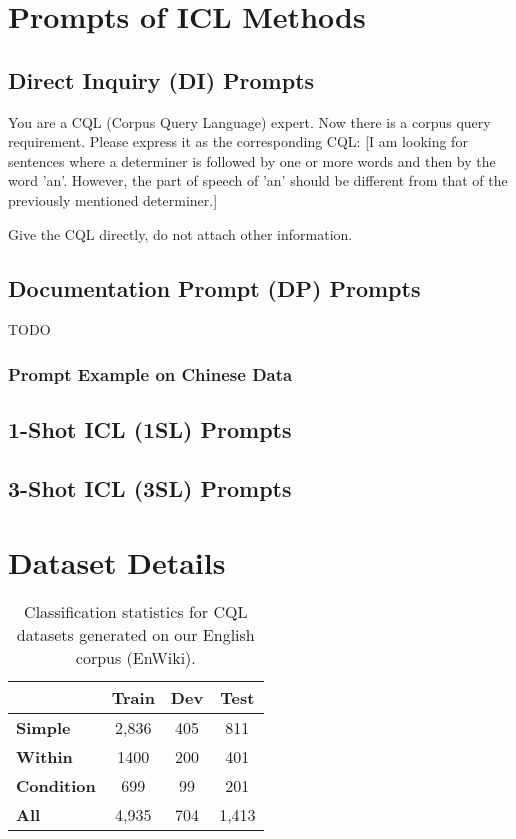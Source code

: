 \documentclass[11pt]{article}
\begin{document}
\begin{CJK*}{UTF8}{gbsn}
\appendix
\label{sec:appendix}

\section{Prompts of ICL Methods}
\label{appendix:prompts}
\subsection{Direct Inquiry (DI) Prompts}

You are a CQL (Corpus Query Language) expert. Now there is a corpus query requirement. Please express it as the corresponding CQL: [I am looking for sentences where a determiner is followed by one or more words and then by the word 'an'. However, the part of speech of 'an' should be different from that of the previously mentioned determiner.]

Give the CQL directly, do not attach other information.

\subsection{Documentation Prompt (DP) Prompts}
TODO
\subsubsection{Prompt Example on Chinese Data}



\subsection{1-Shot ICL (1SL) Prompts}
\subsection{3-Shot ICL (3SL) Prompts}


\section{Dataset Details}
\label{appdix:dataset}
\begin{table}[h!]
\centering
\begin{tabular}{lccc}
\hline
 & \textbf{Train} & \textbf{Dev} & \textbf{Test} \\ \hline
\textbf{Simple} & 2,836 & 405 & 811 \\
\textbf{Within} & 1400 & 200 & 401 \\
\textbf{Condition} & 699 & 99 & 201 \\
\textbf{All} & 4,935 & 704 & 1,413 \\ \hline
\end{tabular}
\caption{Classification statistics for CQL datasets generated on our English corpus (EnWiki).}
\label{tab:datasetdivide}
\end{table}


\end{CJK*}
\end{document}
